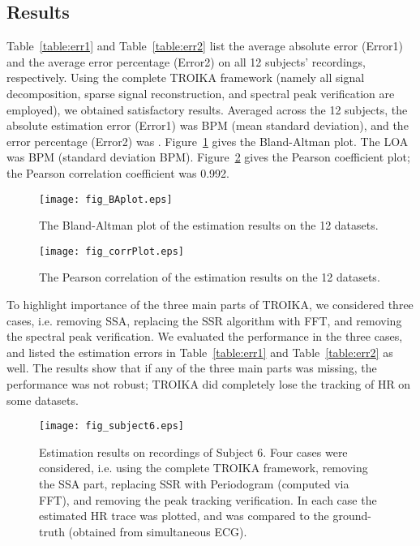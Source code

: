 \documentclass[10pt,twocolumn]{IEEEtran}
\begin{document}
\subsection{Results}

Table~\ref{table:err1} and Table~\ref{table:err2} list the average absolute error (Error1) and the average error percentage (Error2) on all 12 subjects' recordings, respectively. Using the complete TROIKA framework (namely all signal decomposition, sparse signal reconstruction, and spectral peak verification are employed), we obtained satisfactory results. Averaged across the 12 subjects, the absolute estimation error (Error1) was  BPM (mean  standard deviation), and the error percentage (Error2) was . Figure~\ref{fig:BAplot} gives the Bland-Altman plot. The LOA was  BPM (standard deviation  BPM). Figure~\ref{fig:corrPlot} gives the Pearson coefficient plot; the Pearson correlation coefficient was 0.992.




\begin{figure}[t]
\centering
\texttt{[image: fig\_BAplot.eps]}
\caption{The Bland-Altman plot of the estimation results on the 12 datasets.}
\label{fig:BAplot}
\end{figure}

\begin{figure}[t]
\centering
\texttt{[image: fig\_corrPlot.eps]}
\caption{The Pearson correlation of the estimation results on the 12 datasets.}
\label{fig:corrPlot}
\end{figure}





To highlight importance of the three main parts of TROIKA,  we considered three cases, i.e. removing SSA, replacing the SSR algorithm with FFT, and removing the spectral peak verification. We evaluated the performance in the three cases, and listed the estimation errors in Table~\ref{table:err1} and Table~\ref{table:err2} as well. The results show that if any of the three main parts was missing, the performance was not robust; TROIKA did completely lose the tracking of HR on some datasets.



\begin{figure}[t]
\centering
\texttt{[image: fig\_subject6.eps]}
\caption{Estimation results on recordings of Subject 6. Four cases were considered, i.e. using the complete TROIKA framework, removing the SSA part, replacing SSR with Periodogram (computed via FFT), and removing the peak tracking verification. In each case the estimated HR trace was plotted, and was compared to the ground-truth (obtained from simultaneous ECG).}
\label{fig:sub6}
\end{figure}
\end{document}
